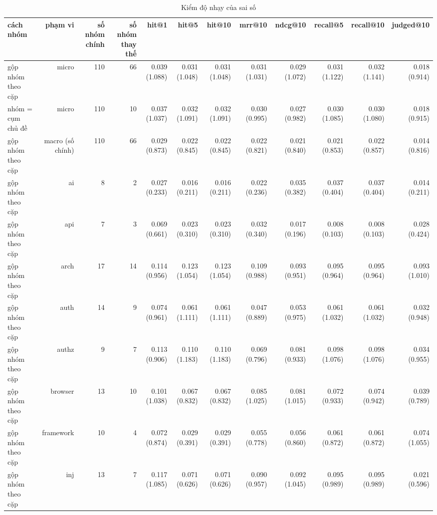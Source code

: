 \begin{table}[ht]
\centering
\caption{Kiểm độ nhạy của sai số}
\begin{tabular}{lrrrrrrrrrrr}
\toprule
cách nhóm & phạm vi & số nhóm chính & số nhóm thay thế & hit@1 & hit@5 & hit@10 & mrr@10 & ndcg@10 & recall@5 & recall@10 & judged@10 \\
\midrule
gộp nhóm theo cặp & micro & 110 & 66 & 0.039 (1.088) & 0.031 (1.048) & 0.031 (1.048) & 0.031 (1.031) & 0.029 (1.072) & 0.031 (1.122) & 0.032 (1.141) & 0.018 (0.914) \\
nhóm = cụm chủ đề & micro & 110 & 10 & 0.037 (1.037) & 0.032 (1.091) & 0.032 (1.091) & 0.030 (0.995) & 0.027 (0.982) & 0.030 (1.085) & 0.030 (1.080) & 0.018 (0.915) \\
gộp nhóm theo cặp & macro (số chính) & 110 & 66 & 0.029 (0.873) & 0.022 (0.845) & 0.022 (0.845) & 0.022 (0.821) & 0.021 (0.840) & 0.021 (0.853) & 0.022 (0.857) & 0.014 (0.816) \\
gộp nhóm theo cặp & ai & 8 & 2 & 0.027 (0.233) & 0.016 (0.211) & 0.016 (0.211) & 0.022 (0.236) & 0.035 (0.382) & 0.037 (0.404) & 0.037 (0.404) & 0.014 (0.211) \\
gộp nhóm theo cặp & api & 7 & 3 & 0.069 (0.661) & 0.023 (0.310) & 0.023 (0.310) & 0.032 (0.340) & 0.017 (0.196) & 0.008 (0.103) & 0.008 (0.103) & 0.028 (0.424) \\
gộp nhóm theo cặp & arch & 17 & 14 & 0.114 (0.956) & 0.123 (1.054) & 0.123 (1.054) & 0.109 (0.988) & 0.093 (0.951) & 0.095 (0.964) & 0.095 (0.964) & 0.093 (1.010) \\
gộp nhóm theo cặp & auth & 14 & 9 & 0.074 (0.961) & 0.061 (1.111) & 0.061 (1.111) & 0.047 (0.889) & 0.053 (0.975) & 0.061 (1.032) & 0.061 (1.032) & 0.032 (0.948) \\
gộp nhóm theo cặp & authz & 9 & 7 & 0.113 (0.906) & 0.110 (1.183) & 0.110 (1.183) & 0.069 (0.796) & 0.081 (0.933) & 0.098 (1.076) & 0.098 (1.076) & 0.034 (0.955) \\
gộp nhóm theo cặp & browser & 13 & 10 & 0.101 (1.038) & 0.067 (0.832) & 0.067 (0.832) & 0.085 (1.025) & 0.081 (1.015) & 0.072 (0.933) & 0.074 (0.942) & 0.039 (0.789) \\
gộp nhóm theo cặp & framework & 10 & 4 & 0.072 (0.874) & 0.029 (0.391) & 0.029 (0.391) & 0.055 (0.778) & 0.056 (0.860) & 0.061 (0.872) & 0.061 (0.872) & 0.074 (1.055) \\
gộp nhóm theo cặp & inj & 13 & 7 & 0.117 (1.085) & 0.071 (0.626) & 0.071 (0.626) & 0.090 (0.957) & 0.092 (1.045) & 0.095 (0.989) & 0.095 (0.989) & 0.021 (0.596) \\

\end{tabular}
\end{table}
